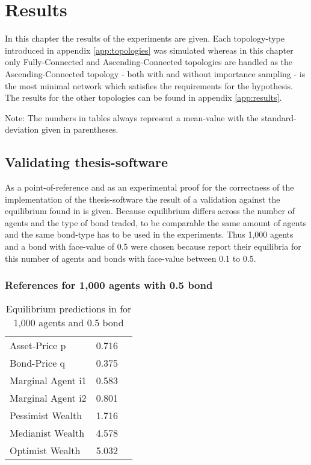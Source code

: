 \documentclass[Bachelorarbeit.tex]{subfiles}
\begin{document}
\graphicspath{{./figures/results/}}	%

\chapter{Results}
\label{ch:results}

In this chapter the results of the experiments are given. Each topology-type introduced in appendix \ref{app:topologies} was simulated whereas in this chapter only Fully-Connected and Ascending-Connected topologies are handled as the Ascending-Connected topology - both with and without importance sampling - is the most minimal network which satisfies the requirements for the hypothesis. The results for the other topologies can be found in appendix \ref{app:results}.

Note: The numbers in tables always represent a mean-value with the standard-deviation given in parentheses.

\section{Validating thesis-software}
As a point-of-reference and as an experimental proof for the correctness of the implementation of the thesis-software the result of a validation against the equilibrium found in \cite{Breuer2015} is given. Because equilibrium differs across the number of agents and the type of bond traded, to be comparable the same amount of agents and the same bond-type has to be used in the experiments. Thus 1,000 agents and a bond with face-value of 0.5 were chosen because \cite{Breuer2015} report their equilibria for this number of agents and bonds with face-value between 0.1 to 0.5.

\subsection{References for 1,000 agents with 0.5 bond}

\begin{table}[H]
	\centering
	\caption{Equilibrium predictions in \cite{Breuer2015} for 1,000 agents and 0.5 bond}
	\begin{tabular} { l c r }
		\hline
		Asset-Price p & 0.716 \\
		Bond-Price q & 0.375 \\
		Marginal Agent i1 & 0.583 \\
		Marginal Agent i2 & 0.801 \\
		\hline
		Pessimist Wealth & 1.716 \\
		Medianist Wealth & 4.578 \\
		Optimist Wealth & 5.032 \\
		\hline
	\end{tabular}
	\label{tab:equilibrium_BREUER_1000}
\end{table}
\end{document}
